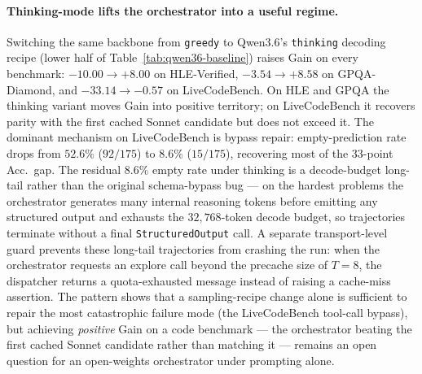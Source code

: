 \paragraph{Thinking-mode lifts the orchestrator into a useful regime.} Switching the same backbone from \texttt{greedy} to Qwen3.6's \texttt{thinking} decoding recipe (lower half of Table~\ref{tab:qwen36-baseline}) raises Gain on every benchmark: $-10.00 \rightarrow +8.00$ on HLE-Verified, $-3.54 \rightarrow +8.58$ on GPQA-Diamond, and $-33.14 \rightarrow -0.57$ on LiveCodeBench. On HLE and GPQA the thinking variant moves Gain into positive territory; on LiveCodeBench it recovers parity with the first cached Sonnet candidate but does not exceed it. The dominant mechanism on LiveCodeBench is bypass repair: empty-prediction rate drops from $52.6\%$ ($92/175$) to $8.6\%$ ($15/175$), recovering most of the $33$-point Acc.\ gap. The residual $8.6\%$ empty rate under thinking is a decode-budget long-tail rather than the original schema-bypass bug --- on the hardest problems the orchestrator generates many internal reasoning tokens before emitting any structured output and exhausts the $32{,}768$-token decode budget, so trajectories terminate without a final \texttt{StructuredOutput} call. A separate transport-level guard prevents these long-tail trajectories from crashing the run: when the orchestrator requests an explore call beyond the precache size of $T{=}8$, the dispatcher returns a quota-exhausted message instead of raising a cache-miss assertion. The pattern shows that a sampling-recipe change alone is sufficient to repair the most catastrophic failure mode (the LiveCodeBench tool-call bypass), but achieving \emph{positive} Gain on a code benchmark --- the orchestrator beating the first cached Sonnet candidate rather than matching it --- remains an open question for an open-weights orchestrator under prompting alone.
